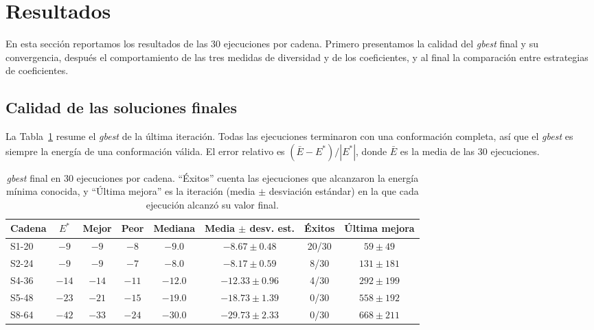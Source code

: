 \section{Resultados}
\label{sec:resultados}

En esta sección reportamos los resultados de las 30 ejecuciones por cadena. Primero presentamos la calidad del \textit{gbest} final y su convergencia, después el comportamiento de las tres medidas de diversidad y de los coeficientes, y al final la comparación entre estrategias de coeficientes.

\subsection{Calidad de las soluciones finales}
\label{sec:res_finales}

La Tabla~\ref{tab:gbest_final} resume el \textit{gbest} de la última iteración. Todas las ejecuciones terminaron con una conformación completa, así que el \textit{gbest} es siempre la energía de una conformación válida. El error relativo es $(\bar{E} - E^*)/|E^*|$, donde $\bar{E}$ es la media de las 30 ejecuciones.

\begin{table}[H]
\centering
\caption{\textit{gbest} final en 30 ejecuciones por cadena. ``Éxitos'' cuenta las ejecuciones que alcanzaron la energía mínima conocida, y ``Última mejora'' es la iteración (media $\pm$ desviación estándar) en la que cada ejecución alcanzó su valor final.}
\label{tab:gbest_final}
\small
\setlength{\tabcolsep}{4pt}
\begin{adjustbox}{max width=\textwidth}
\begin{tabular}{lccccccc}
\toprule
Cadena & $E^*$ & Mejor & Peor & Mediana & Media $\pm$ desv. est. & Éxitos & Última mejora \\
\midrule
S1-20 & $-9$  & $-9$  & $-8$  & $-9.0$  & $-8.67 \pm 0.48$  & 20/30 & $59 \pm 49$ \\
S2-24 & $-9$  & $-9$  & $-7$  & $-8.0$  & $-8.17 \pm 0.59$  & 8/30  & $131 \pm 181$ \\
S4-36 & $-14$ & $-14$ & $-11$ & $-12.0$ & $-12.33 \pm 0.96$ & 4/30  & $292 \pm 199$ \\
S5-48 & $-23$ & $-21$ & $-15$ & $-19.0$ & $-18.73 \pm 1.39$ & 0/30  & $558 \pm 192$ \\
S8-64 & $-42$ & $-33$ & $-24$ & $-30.0$ & $-29.73 \pm 2.33$ & 0/30  & $668 \pm 211$ \\
\bottomrule
\end{tabular}
\end{adjustbox}
\end{table}

